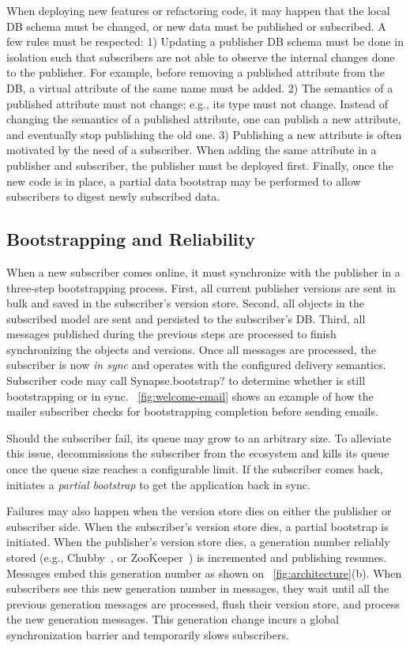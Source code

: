 When deploying new features or refactoring code, it may happen that the local DB
schema must be changed, or new data must be published or subscribed. A few rules
must be respected:
1) Updating a publisher DB schema must be done in isolation such that subscribers
are not able to observe the internal changes done to the publisher. For example,
before removing a published attribute from the DB, a virtual attribute of the
same name must be added.
2) The semantics of a published attribute must not change; e.g., its type must
not change.  Instead of changing the semantics of a published attribute, one can
publish a new attribute, and eventually stop publishing the old one.
3) Publishing a new attribute is often motivated by the need of a subscriber.
When adding the same attribute in a publisher and subscriber, the publisher
must be deployed first.
Finally, once the new code is in place, a partial data bootstrap may be
performed to allow subscribers to digest newly subscribed data.

\subsection{Bootstrapping and Reliability} \label{sec:arch:bootstrapping}

When a new subscriber comes online, it must synchronize with the publisher in a
three-step bootstrapping process. First, all current publisher versions are sent
in bulk and saved in the subscriber's version store. Second, all objects in the subscribed model are sent and persisted to the subscriber's DB. Third, all messages
published during the previous steps are processed to finish synchronizing the
objects and versions. Once all messages are processed, the subscriber is now
{\em in sync} and operates with the configured delivery semantics.
Subscriber code may call {\code Synapse.bootstrap?} to determine whether \synapse
is still bootstrapping or in sync. \F~\ref{fig:welcome-email} shows an example of
how the mailer subscriber checks for bootstrapping completion before sending emails.

Should the subscriber fail, its queue may grow to an arbitrary size. To
alleviate this issue, \synapse decommissions the subscriber from the
\synapse ecosystem and kills its queue once the queue size reaches a
configurable limit. If the subscriber comes back, \synapse initiates a
{\em partial bootstrap} to get the application back in sync.

Failures may also happen when the version store dies on either the publisher or subscriber
side. When the subscriber's version store dies, a partial bootstrap is initiated. When
the publisher's version store dies, a generation number reliably stored (e.g.,
Chubby~\cite{chubby:osdi}, or ZooKeeper~\cite{zookeeper}) is incremented
and publishing resumes. Messages embed this generation number as shown on
\F~\ref{fig:architecture}(b). When subscribers see this new generation number
 in messages, they wait until all the previous generation messages are
processed, flush their version store, and process the new generation messages.
This generation change incurs a global synchronization barrier and
temporarily slows subscribers.


